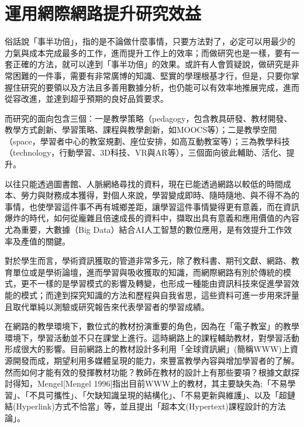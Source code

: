 \section{運用網際網路提升研究效益}
\par
\renewcommand{\baselinestretch}{1} %
\twelve 俗話說「事半功倍」，指的是不論做什麼事情，只要方法對了，必定可以用最少的力氣與成本完成最多的工作，進而提升工作上的效率；而做研究也是一樣，要有一套正確的方法，就可以達到「事半功倍」的效果。或許有人會質疑說，做研究是非常困難的一件事，需要有非常廣博的知識、堅實的學理根基才行，但是，只要你掌握住研究的要領以及方法且多善用數據分析，也仍能可以有效率地推展完成，進而從容改進，並達到超乎預期的良好品質要求。
\\
\par
\renewcommand{\baselinestretch}{1} %
\twelve 而研究的面向包含三個：一是教學策略（pedagogy，包含教具研發、教材開發、教學方式創新、學習策略、課程與教學創新，如MOOCS等）；二是教學空間（space，學習者中心的教室規劃、座位安排，如高互動教室等）；三為教學科技（technology，行動學習、3D科技、VR與AR等），三個面向彼此輔助、活化、提升。
\\
\par
\renewcommand{\baselinestretch}{1} %
\twelve 以往只能透過圖書館、人脈網絡尋找的資料，現在已能透過網路以較低的時間成本、勞力與財務成本獲得，對個人來說，學習變成即時、隨時隨地、與不得不為的事情，也使學習這件事不再有城鄉差距，讓學習這件事情變得更有意義，而在資訊爆炸的時代，如何從龐雜且倍速成長的資料中，擷取出具有意義和應用價值的內容尤為重要，大數據（Big Data）結合AI人工智慧的數位應用，是有效提升工作效率及產值的關鍵。
\\
\par
\renewcommand{\baselinestretch}{1} %
\twelve 對於學生而言，學術資訊獲取的管道非常多元，除了教科書、期刊文獻、網路、教育單位或是學術論壇，進而學習與吸收獲取的知識，而網際網路有別於傳統的模式，更不一樣的是學習模式的影響及轉變，也形成一種能由資訊科技來促進學習效能的模式；而達到探究知識的方法和歷程與自我省思，這些資料可進一步用來評量且取代單純以測驗或研究報告來代表學習者的學習成績。
\\
\par
\renewcommand{\baselinestretch}{1} %
\twelve 在網路的教學環境下，數位式的教材扮演重要的角色，因為在「電子教室」的教學環境下，學習活動並不只在課堂上進行。這時網路上的課程輔助教材，對學習活動形成很大的影響。目前網路上的教材設計多利用「全球資訊網」(簡稱WWW)上資源開發而成，期望利用多媒體呈現的能力，來豐富教學內容與增加學習者的了解。然而如何才能有效的發揮教材功能？教師在教材的設計上有那些要項？根據文獻探討得知，Mengel[Mengel 1996]指出目前WWW上的教材，其主要缺失為;「不易學習」、「不具可攜性」、「欠缺知識呈現的結構化」、「不易更新與維護」、以及「超鏈結(Hyperlink)方式不恰當」等，並且提出「超本文(Hypertext)課程設計的方法論」。
